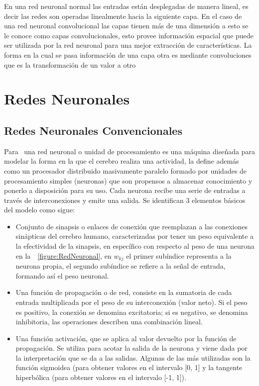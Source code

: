 En una red neuronal normal las entradas están desplegadas de manera lineal, es decir las redes son operadas linealmente hacia la siguiente capa. En el caso de una red neuronal convolucional las capas tienen más de una dimensión a esto se le conoce como capas convolucionales, esto provee información espacial que puede ser utilizada por la red neuronal para una mejor extracción de características. La forma en la cual se pasa información de una capa otra es mediante convoluciones que es la transformación de un valor a otro

\section{Redes Neuronales}
\subsection{Redes Neuronales Convencionales}
\label{section:marcoTeorico:redesneuronales}
Para~\cite{Haykin1994} una red neuronal o unidad de procesamiento es una máquina diseñada para modelar la forma en la que el cerebro realiza una actividad, la define además como un procesador distribuido masivamente paralelo formado por unidades de procesamiento simples (neuronas) que son propensos a almacenar conocimiento y ponerlo a disposición para su uso. Cada neurona recibe una serie de entradas a través de interconexiones y emite una salida. Se identifican 3 elementos básicos del modelo como sigue:
\begin{itemize}
\item Conjunto de sinapsis o enlaces de conexión que reemplazan a las conexiones sinápticas del cerebro humano, caracterizadas por tener un peso equivalente a la efectividad de la sinapsis, en específico con respecto al peso de una neurona en la~\figurename~\ref{figure:RedNeuronal}, en $w_{kj}$ el primer subíndice representa a la neurona propia, el segundo subíndice se refiere a la señal de entrada, formando así el peso neuronal.
\item Una función de propagación o de red, consiste en la sumatoria de cada entrada multiplicada por el peso de su interconexión (valor neto). Si el peso es positivo, la conexión se denomina excitatoria; si es negativo, se denomina inhibitoria, las operaciones describen una combinación lineal.
\item Una función activación, que se aplica al valor devuelto por la función de propagación. Se utiliza para acotar la salida de la neurona y viene dada por la interpretación que se da a las salidas. Algunas de las más utilizadas son la función sigmoidea (para obtener valores en el intervalo [0, 1] y la tangente hiperbólica (para obtener valores en el intervalo [-1, 1]).
\end{itemize}

